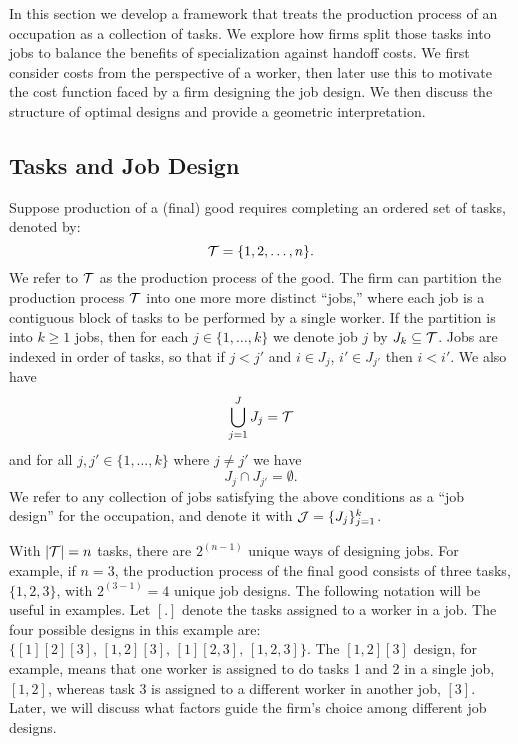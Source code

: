 \documentclass{article}
\theoremstyle{plain}
\theoremstyle{plain}
\begin{document}
In this section we develop a framework that treats the production process of an occupation as a collection of tasks. We explore how firms split those tasks into jobs to balance the benefits of specialization against handoff costs. We first consider costs from the perspective of a worker, then later use this to motivate the cost function faced by a firm designing the job design.  We then discuss the structure of optimal designs and provide a geometric interpretation.


\subsection{Tasks and Job Design}
\label{sec:job_design}

Suppose production of a (final) good requires completing an ordered set of tasks, denoted by:
\begin{equation}
\label{eq:tasks}
\mathcal{T} = \{1,2,\ldots,n\}.
\end{equation}
We refer to $\mathcal{T}$ as the production process of the good.
The firm can partition the production process $\mathcal{T}$ into one more more distinct ``jobs,'' where each job is a contiguous block of tasks to be performed by a single worker.
If the partition is into $k \geq 1$ jobs, then for each $j \in \{1, \dotsc, k\}$ we denote job $j$ by $J_k \subseteq \mathcal{T}$.  Jobs are indexed in order of tasks, so that if $j < j'$ and $i \in J_j$, $i' \in J_{j'}$ then $i < i'$.  We also have
\[
\bigcup_{j=1}^J J_j = \mathcal{T}
\]
and for all $j,j' \in \{1,\dots,k\}$ where $j \neq j'$ we have
\[
J_j \cap J_{j'} = \emptyset.
\]
We refer to any collection of jobs satisfying the above conditions as a ``job design'' for the occupation, and denote it with $\mathcal{J} = \{J_j\}_{j=1}^{k}$.

With $|\mathcal{T}| = n$ tasks, there are $2^{(n - 1)}$ unique ways of designing jobs.
For example, if $n = 3$, the production process of the final good consists of three tasks, $\{1,2,3\}$, with $2^{(3-1)}=4$ unique job designs.  The following notation will be useful in examples.
Let $[.]$ denote the tasks assigned to a worker in a job.
The four possible designs in this example are: $\{[1][2][3], \, [1,2][3], \, [1][2,3], \, [1,2,3]\}$.
The $[1,2][3]$ design, for example, means that one worker is assigned to do tasks 1 and 2 in a single job, $[1,2]$, whereas task 3 is assigned to a different worker in another job, $[3]$.
Later, we will discuss what factors guide the firm’s choice among different job designs.
\end{document}
